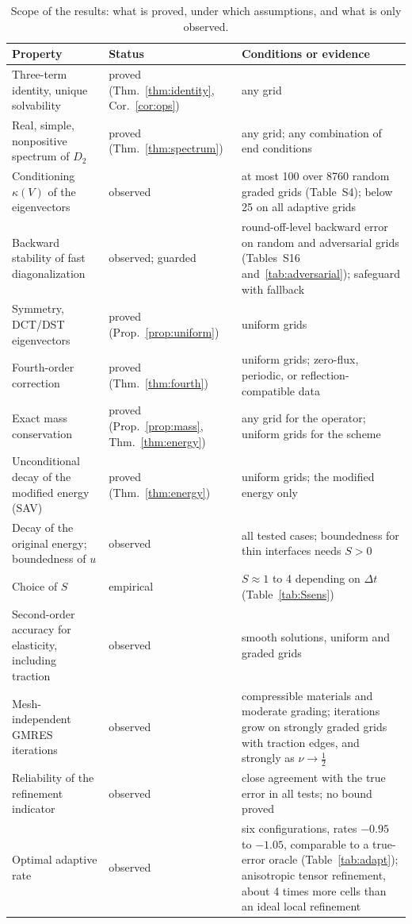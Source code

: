 \documentclass[preprint,12pt]{elsarticle}
\theoremstyle{remark}
\begin{document}
\begin{table}[t]\centering\small
\caption{Scope of the results: what is proved, under which assumptions, and what is only observed.}\label{tab:scope}
\begin{tabular}{p{4.3cm}p{3.5cm}p{5.7cm}}
\toprule
Property & Status & Conditions or evidence\\
\midrule
Three-term identity, unique solvability & proved (Thm.~\ref{thm:identity}, Cor.~\ref{cor:ops}) & any grid \\
Real, simple, nonpositive spectrum of $D_2$ & proved (Thm.~\ref{thm:spectrum}) & any grid; any combination of end conditions \\
Conditioning $\kappa(V)$ of the eigenvectors & observed & at most 100 over 8760 random graded grids (Table~S4); below 25 on all adaptive grids \\
Backward stability of fast diagonalization & observed; guarded & round-off-level backward error on random and adversarial grids (Tables~S16 and~\ref{tab:adversarial}); safeguard with fallback \\
Symmetry, DCT/DST eigenvectors & proved (Prop.~\ref{prop:uniform}) & uniform grids \\
Fourth-order correction & proved (Thm.~\ref{thm:fourth}) & uniform grids; zero-flux, periodic, or reflection-compatible data \\
Exact mass conservation & proved (Prop.~\ref{prop:mass}, Thm.~\ref{thm:energy}) & any grid for the operator; uniform grids for the scheme \\
Unconditional decay of the modified energy (SAV) & proved (Thm.~\ref{thm:energy}) & uniform grids; the modified energy only \\
Decay of the original energy; boundedness of $u$ & observed & all tested cases; boundedness for thin interfaces needs $S>0$ \\
Choice of $S$ & empirical & $S\approx1$ to 4 depending on $\Delta t$ (Table~\ref{tab:Ssens}) \\
Second-order accuracy for elasticity, including traction & observed & smooth solutions, uniform and graded grids \\
Mesh-independent GMRES iterations & observed & compressible materials and moderate grading; iterations grow on strongly graded grids with traction edges, and strongly as $\nu\to\tfrac12$ \\
Reliability of the refinement indicator & observed & close agreement with the true error in all tests; no bound proved \\
Optimal adaptive rate & observed & six configurations, rates $-0.95$ to $-1.05$, comparable to a true-error oracle (Table~\ref{tab:adapt}); anisotropic tensor refinement, about 4 times more cells than an ideal local refinement \\
\bottomrule
\end{tabular}
\end{table}
\end{document}
